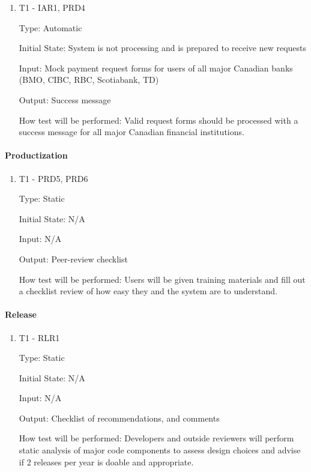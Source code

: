 \documentclass[12pt, titlepage]{article}
\begin{document}
\begin{enumerate}

\item{T1 - IAR1, PRD4\\}

Type: Automatic

Initial State: System is not processing and is prepared to receive new requests

Input: Mock payment request forms for users of all major Canadian banks (BMO, CIBC, RBC, Scotiabank, TD)

Output: Success message

How test will be performed: Valid request forms should be processed with a success message for all major Canadian financial institutions.

\end{enumerate}

\paragraph{Productization}

\begin{enumerate}

\item{T1 - PRD5, PRD6\\}
  
Type: Static 

Initial State: N/A

Input: N/A

Output: Peer-review checklist

How test will be performed: Users will be given training materials and fill out a checklist review of how easy they and the system are to understand.

\end{enumerate}

\paragraph{Release}

\begin{enumerate}

\item{T1 - RLR1\\}
  
Type: Static

Initial State: N/A

Input: N/A

Output: Checklist of recommendations, and comments

How test will be performed: Developers and outside reviewers will perform static analysis of major code components to assess design choices and advise if 2 releases per year is doable and appropriate.

\end{enumerate}
\end{document}
